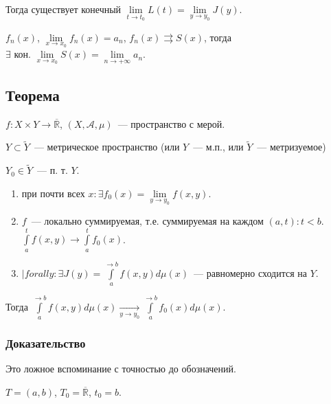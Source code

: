 \documentclass{article}
\begin{document}
        Тогда существует конечный $\lim\limits_{t \rightarrow t_0} L(t) = \lim\limits_{y \rightarrow y_0} J(y)$.
        
        $f_n(x)$, $\lim\limits_{x \rightarrow x_0} f_n(x) = a_n$, $f_n(x) \rightrightarrows S(x)$, тогда $\exists \text { кон. } \lim\limits_{x \rightarrow x_0} S(x) = \lim\limits_{n \rightarrow +\infty} a_n$.
        
    \subsection{Теорема}
    
        $f : X \times Y \rightarrow \overline{\mathbb{R}}$, $(X, \mathcal{A}, \mu)$~--- пространство с мерой.
        
        $Y \subset \widetilde{Y}$~--- метрическое пространство (или $Y$~--- м.п., или $\widetilde{Y}$~--- метризуемое)
        
        $Y_0 \in \widetilde{Y}$~--- п. т. $Y$.
        
        \begin{enumerate}
        
            \item при почти всех $x : \exists f_0(x) = \lim\limits_{y \rightarrow y_0} f(x, y)$.
            
            \item $f$~--- локально суммируемая, т.е. суммируемая на каждом $(a, t) : t < b$. $\int\limits^t_a f(x, y) \rightarrow \int\limits^t_a f_0(x)$.
            
            \item $|forall y : \exists J(y) = \int\limits^{\rightarrow b}_a f(x, y) d \mu (x)$~--- равномерно сходится на $Y$.
            
        \end{enumerate}
        
        Тогда $\int\limits^{\rightarrow b}_a f(x, y) d \mu(x) \xrightarrow[y \rightarrow y_0]{} \int\limits^{\rightarrow b}_a f_0(x) d \mu(x)$.
        
        \subsubsection{Доказательство}
        
            Это ложное вспоминание с точностью до обозначений.
            
            $T = (a, b)$, $T_0 = \overline{\mathbb{R}}$, $t_0 = b$.
            
\end{document}
